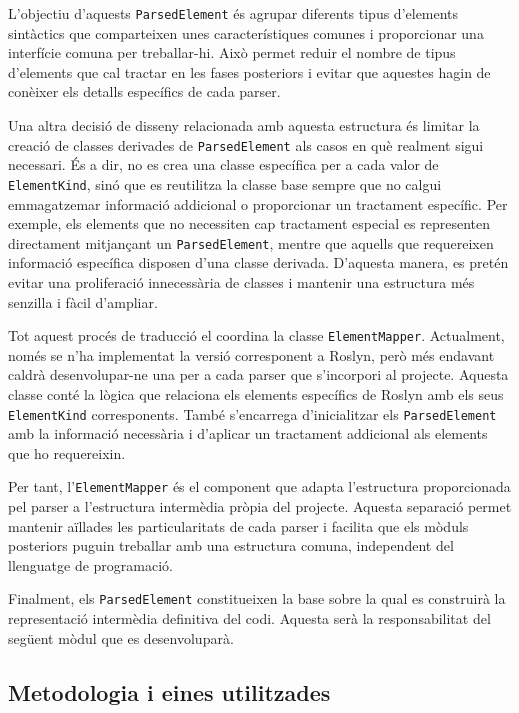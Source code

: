 L'objectiu d'aquests \texttt{ParsedElement} és agrupar diferents tipus d'elements sintàctics que comparteixen unes característiques comunes i proporcionar una interfície comuna per treballar-hi. Això permet reduir el nombre de tipus d'elements que cal tractar en les fases posteriors i evitar que aquestes hagin de conèixer els detalls específics de cada parser.

Una altra decisió de disseny relacionada amb aquesta estructura és limitar la creació de classes derivades de \texttt{ParsedElement} als casos en què realment sigui necessari. És a dir, no es crea una classe específica per a cada valor de \texttt{ElementKind}, sinó que es reutilitza la classe base sempre que no calgui emmagatzemar informació addicional o proporcionar un tractament específic. Per exemple, els elements que no necessiten cap tractament especial es representen directament mitjançant un \texttt{ParsedElement}, mentre que aquells que requereixen informació específica disposen d'una classe derivada. D'aquesta manera, es pretén evitar una proliferació innecessària de classes i mantenir una estructura més senzilla i fàcil d'ampliar.

Tot aquest procés de traducció el coordina la classe \texttt{ElementMapper}. Actualment, només se n'ha implementat la versió corresponent a Roslyn, però més endavant caldrà desenvolupar-ne una per a cada parser que s'incorpori al projecte. Aquesta classe conté la lògica que relaciona els elements específics de Roslyn amb els seus \texttt{ElementKind} corresponents. També s'encarrega d'inicialitzar els \texttt{ParsedElement} amb la informació necessària i d'aplicar un tractament addicional als elements que ho requereixin.

Per tant, l'\texttt{ElementMapper} és el component que adapta l'estructura proporcionada pel parser a l'estructura intermèdia pròpia del projecte. Aquesta separació permet mantenir aïllades les particularitats de cada parser i facilita que els mòduls posteriors puguin treballar amb una estructura comuna, independent del llenguatge de programació.

Finalment, els \texttt{ParsedElement} constitueixen la base sobre la qual es construirà la representació intermèdia definitiva del codi. Aquesta serà la responsabilitat del següent mòdul que es desenvoluparà.

\subsection*{Metodologia i eines utilitzades}

